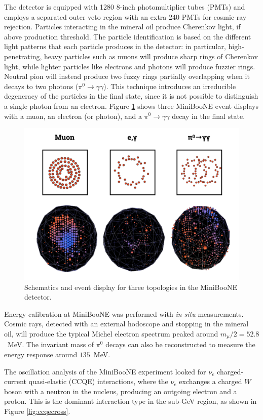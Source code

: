 The detector is equipped with 1280 8-inch photomultiplier tubes (PMTs) and employs a separated outer veto region with an extra 240 PMTs for cosmic-ray rejection. Particles interacting in the mineral oil produce Cherenkov light, if above production threshold. The particle identification is based on the different light patterns that each particle produces in the detector: in particular, high-penetrating, heavy particles such as muons will produce sharp rings of Cherenkov light, while lighter particles like electrons and photons will produce fuzzier rings. Neutral pion will instead produce two fuzzy rings partially overlapping when it decays to two photons ($\pi^{0}\rightarrow \gamma\gamma$). 
This technique introduces an irreducible degeneracy of the particles in the final state, since it is not possible to distinguish a single photon from an electron. Figure \ref{fig:miniboone_evd} shows three MiniBooNE event displays with a muon, an electron (or photon), and a $\pi^0\rightarrow\gamma\gamma$ decay in the final state.

\begin{figure}[htbp]
    \centering
    \includegraphics[width=0.85\linewidth]{figures/miniboone_evd.png}
    \caption{Schematics and event display for three topologies in the MiniBooNE detector.}
    \label{fig:miniboone_evd}
\end{figure}

Energy calibration at MiniBooNE was performed with \emph{in situ} measurements. Cosmic rays, detected with an external hodoscope and stopping in the mineral oil, will produce the typical Michel electron spectrum peaked around $m_{\mu}/2 = 52.8$~MeV. The invariant mass of $\pi^0$ decays can also be reconstructed to measure the energy response around $135$~MeV. 

The oscillation analysis of the MiniBooNE experiment looked for $\nu_e$ charged-current quasi-elastic (CCQE) interactions, where the $\nu_{e}$ exchanges a charged $W$ boson with a neutron in the nucleus, producing an outgoing electron and a proton. This is the dominant interaction type in the sub-GeV region, as shown in Figure \ref{fig:ccqecross}.

